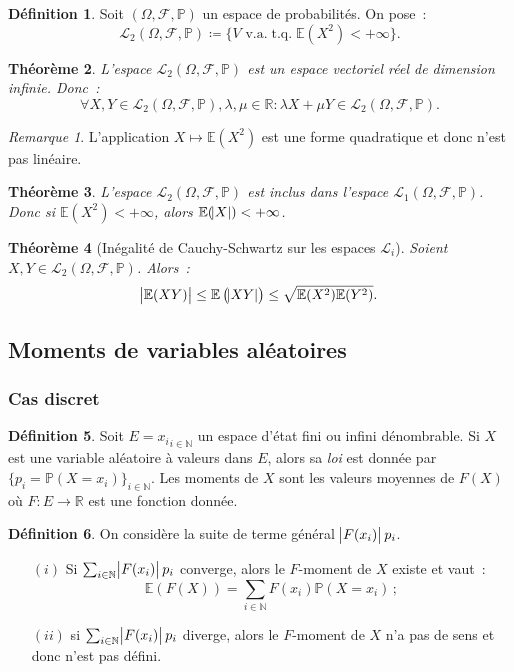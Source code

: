 \documentclass{article}
\newcommand{\E}{\mathbb E}
\newcommand{\N}{\mathbb N}
\renewcommand{\P}{\mathbb P}
\newcommand{\R}{\mathbb R}
\newcommand{\espproba}[3]{\left(#1, #2, #3\right)}
\newcommand{\Ofp}{\espproba \Omega{\mathcal F}\P}
\newcommand{\Lu}{\mathcal L_1\Ofp}
\newcommand{\Ld}{\mathcal L_2\Ofp}
\DeclareMathOperator{\tq}{t.q.}
\newtheorem{thm}{Théorème}[section]
\theoremstyle{definition}
\newtheorem{déf}[thm]{Définition}
\theoremstyle{remark}
\newtheorem*{rmq}{Remarque}
\begin{document}
		\begin{déf} Soit $\Ofp$ un espace de probabilités. On pose~:
		\[\Ld \coloneqq \{V \text{ v.a.} \tq \E(X^2) < +\infty\}.\]
		\end{déf}

		\begin{thm} L'espace $\Ld$ est un espace vectoriel réel de dimension infinie. Donc~:
		\[\forall X, Y \in \Ld, \lambda, \mu \in \R : \lambda X + \mu Y \in \Ld.\]
		\end{thm}

		\begin{rmq} L'application $X \mapsto \E(X^2)$ est une forme quadratique et donc n'est pas linéaire. \end{rmq}

		\begin{thm} L'espace $\Ld$ est inclus dans l'espace $\Lu$. Donc si $\E(X^2) < +\infty$, alors $\E(\abs X) < +\infty$. \end{thm}

		\begin{thm}[Inégalité de Cauchy-Schwartz sur les espaces $\mathcal L_i$] Soient $X, Y \in \Ld$. Alors~:
		\begin{equation}\label{eq:C-SL2}
			\abs {\E(XY)} \leq \E\left(\abs {XY}\right) \leq \sqrt{\E(X^2)\E(Y^2)}.
		\end{equation}
		\end{thm}

	\subsection{Moments de variables aléatoires}
		\subsubsection{Cas discret}
		\begin{déf} Soit $E = {x_i}_{i \in \N}$ un espace d'état fini ou infini dénombrable. Si $X$ est une variable aléatoire à valeurs dans $E$, alors sa 
		\emph{loi} est donnée par $\{p_i = \P(X = x_i)\}_{i \in \N}$. Les moments de $X$ sont les valeurs moyennes de $F(X)$ où $F : E \to \R$ est une fonction
		donnée. \end{déf}

		\begin{déf} On considère la suite de terme général $\abs {F(x_i)}p_i$.

		\begin{itemize}
			\item[$(i)$] Si $\sum_{i \in \N}\abs{F(x_i)}p_i$ converge, alors le $F$-moment de $X$ existe et vaut~:
			             \[\E(F(X)) = \sum_{i \in \N}F(x_i)\P(X=x_i)\,;\]
			\item[$(ii)$] si $\sum_{i \in \N}\abs{F(x_i)}p_i$ diverge, alors le $F$-moment de $X$ n'a pas de sens et donc n'est pas défini.
		\end{itemize}
		\end{déf}
\end{document}

